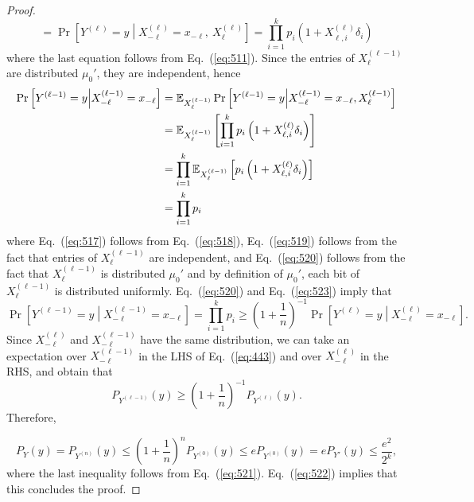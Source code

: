 \documentclass[final, 12pt]{colt2018}
\renewcommand{\eqref}[1]{Eq.~(\ref{#1})}
\begin{document}
\begin{proof}
\begin{equation}
=\Pr\left[Y^{(\ell)} = y \middle| X^{(\ell)}_{-\ell} = x_{-\ell},\ X^{(\ell)}_\ell \right]
= \prod_{i=1}^k p_i\left(1 + X_{\ell,i}^{(\ell)} \delta_i \right)
\end{equation}
where the last equation follows from \eqref{eq:511}. 
Since the entries of $X^{(\ell-1)}_\ell$ are distributed $\mu_0'$, they are independent, hence
\begin{align}
\Pr\left[Y^{(\ell-1)} = y \middle| X^{(\ell-1)}_{-\ell} = x_{-\ell} \right]
&= \mathbb{E}_{X^{(\ell-1)}_\ell}\Pr\left[Y^{(\ell-1)} = y \middle| X^{(\ell-1)}_{-\ell} = x_{-\ell}, X^{(\ell-1)}_\ell \right] \notag \\
&= \mathbb{E}_{X^{(\ell-1)}_\ell} \left[ \prod_{i=1}^k p_i\left(1 + X_{\ell,i}^{(\ell)} \delta_i \right) \right]\label{eq:517} \\
&=  \prod_{i=1}^k \mathbb{E}_{X^{(\ell-1)}_\ell} \left[ p_i\left(1 + X_{\ell,i}^{(\ell)} \delta_i \right) \right]\label{eq:519} \\
&= \prod_{i=1}^k p_i \label{eq:520}
\end{align}
where \eqref{eq:517} follows from \eqref{eq:518}, \eqref{eq:519} follows from the fact that entries of $X^{(\ell-1)}_\ell$ are independent, and \eqref{eq:520} follows from the fact that $X_\ell^{(\ell-1)}$ is distributed $\mu_0'$ and by definition of $\mu_0'$, each bit of $X_\ell^{(\ell-1)}$ is distributed uniformly. \eqref{eq:520} and \eqref{eq:523} imply that
\begin{equation} \label{eq:443}
\Pr\left[Y^{(\ell-1)} = y \middle| X^{(\ell-1)}_{-\ell} = x_{-\ell} \right]
= \prod_{i=1}^k p_i
\ge \left( 1 + \frac{1}{n}\right)^{-1} \Pr\left[Y^{(\ell)} = y \middle| X^{(\ell)}_{-\ell} = x_{-\ell} \right].
\end{equation}
Since $X_{-\ell}^{(\ell)}$ and $X^{(\ell-1)}_{-\ell}$ have the same distribution, we can take an expectation over $X_{-\ell}^{(\ell-1)}$ in the LHS of \eqref{eq:443} and over $X^{(\ell)}_{-\ell}$ in the RHS, and obtain that
\[
P_{Y^{(\ell-1)}}(y) \ge \left( 1 + \frac{1}{n}\right)^{-1} P_{Y^{(\ell)}}(y).
\]
Therefore,


\[
P_Y(y)
= P_{Y^{(n)}}(y)
\le \left( 1 + \frac{1}{n} \right)^n P_{Y^{(0)}}(y)
\le e P_{Y^{(0)}}(y)
= e P_{Y'}(y)
\le \frac{e^2}{2^k},
\]
where the last inequality follows from \eqref{eq:521}. \eqref{eq:522} implies that this concludes the proof.
\end{proof}
\end{document}
